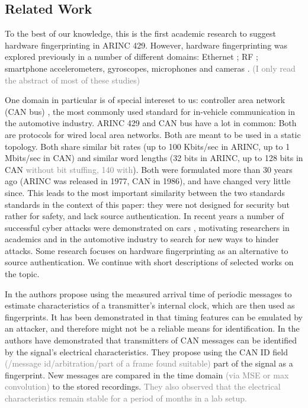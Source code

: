 \documentclass[conference]{IEEEtran}
\begin{document}
\subsection{Related Work}
  To the best of our knowledge, this is the first academic research to suggest hardware fingerprinting in ARINC 429. However, hardware fingerprinting was explored previously in a number of different domains: Ethernet \cite{kohno2005remote, uluagac2013passive, gerdes2012physical}; RF \cite{ellis2001characteristics, hall2003detection, hall2005radio, ureten2007wireless, brik2008wireless, xu2015device}; smartphone accelerometers, gyroscopes, microphones and cameras \cite{lukavs2006digital, li2010source, dey2014accelprint, bojinov2014mobile, das2014you, das2016tracking}. \textcolor{gray}{(I only read the abstract of most of these studies)}
  
  One domain in particular is of special intereset to us: controller area network (CAN bus) \cite{}, the most commonly used standard for in-vehicle communication in the automotive industry. ARINC 429 and CAN bus have a lot in common: Both are protocols for wired local area networks. Both are meant to be used in a static topology. Both share similar bit rates (up to 100 Kbits/sec in ARINC, up to 1 Mbits/sec in CAN) and similar word lengths (32 bits in ARINC, up to 128 bits in CAN \textcolor{gray}{without bit stuffing, 140 with}). Both were formulated more than 30 years ago (ARINC was released in 1977, CAN in 1986), and have changed very little since. This leads to the most important similarity between the two standards standards in the context of this paper: they were not designed for security but rather for safety, and lack source authentication.
  In recent years a number of successful cyber attacks were demonstrated on cars \cite{}, motivating researchers in academics and in the automotive industry to search for new ways to hinder attacks. Some research focuses on hardware fingerprinting as an alternative to source authentication. We continue with short descriptions of selected works on the topic.
  
  
  In \cite{cho2016fingerprinting} the authors propose using the measured arrival time of periodic messages to estimate characteristics of a transmitter's internal clock, which are then used as fingerprints. It has been demonstrated in \cite{sagong2018cloaking} that timing features can be emulated by an attacker, and therefore might not be a reliable means for identification.
  In \cite{murvay2014source} the authors have demonstrated that transmitters of CAN messages can be identified by the signal's electrical characteristics. They propose using the CAN ID field \textcolor{gray}{(/message id/arbitration/part of a frame found suitable)} part of the signal as a fingerprint. New messages are compared in the time domain \textcolor{gray}{(via MSE or max convolution)} to the stored recordings. \textcolor{gray}{They also observed that the electrical characteristics remain stable for a period of months in a lab setup.}
  
\end{document}
